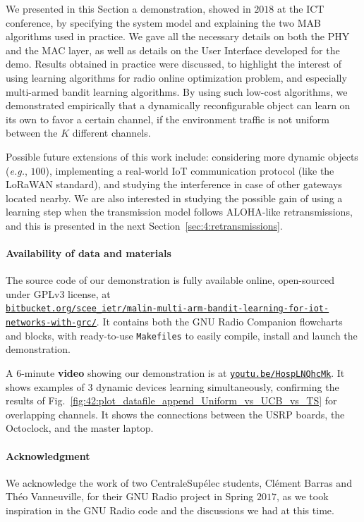 We presented in this Section a demonstration, showed in $2018$ at the ICT conference,
by specifying the system model and explaining the two MAB algorithms used in practice.
We gave all the necessary details on both the PHY and the MAC layer, as well as details on the User Interface developed for the demo.
Results obtained in practice were discussed, to highlight the interest of using learning algorithms for radio online optimization problem, and especially multi-armed bandit learning algorithms.
%
By using such low-cost algorithms, we demonstrated empirically that a dynamically reconfigurable object can learn on its own to favor a certain channel, if the environment traffic is not uniform between the $K$ different channels.


Possible future extensions of this work include:
considering more dynamic objects (\emph{e.g.}, $100$),
implementing a real-world IoT communication protocol (like the LoRaWAN standard),
and studying the interference in case of other gateways located nearby.
%
We are also interested in studying the possible gain of using a learning step when the transmission model follows ALOHA-like retransmissions, and this is presented in the next Section~\ref{sec:4:retransmissions}.


\paragraph{Availability of data and materials}
%
The source code of our demonstration is fully available online, open-sourced under GPLv3 license, at\\
\href{https://bitbucket.org/scee_ietr/malin-multi-arm-bandit-learning-for-iot-networks-with-grc}{\texttt{bitbucket.org/scee\_ietr/malin-multi-arm-bandit-learning-for-iot-networks-with-grc/}}.
It contains both the GNU Radio Companion flowcharts and blocks, with ready-to-use \texttt{Makefiles} to easily compile, install and launch the demonstration.

A $6$-minute \textbf{video} showing our demonstration is at \texttt{\url{youtu.be/HospLNQhcMk}}.
It shows examples of $3$ dynamic devices learning simultaneously, confirming the results of Fig.~\ref{fig:42:plot_datafile_append_Uniform_vs_UCB_vs_TS} for overlapping channels.
It shows the connections between the USRP boards, the Octoclock, and the master laptop.

\paragraph{Acknowledgment}
%
We acknowledge the work of two CentraleSup{\'e}lec students,
Cl{\'e}ment Barras and Th{\'e}o Vanneuville, for their GNU Radio project in Spring $2017$,
as we took inspiration in the GNU Radio code and the discussions we had at this time.




